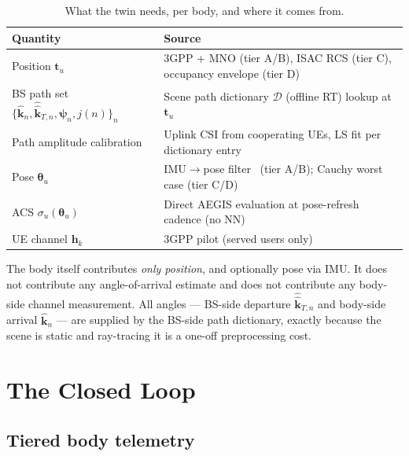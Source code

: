 \documentclass[journal,twocolumn,10pt]{IEEEtran}
\theoremstyle{definition}
\newcommand{\khat}{\hat{\bm{k}}}
\newcommand{\hh}{\mathbf{h}}
\newcommand{\Dict}{\mathcal{D}}
\begin{document}
\begin{table}[!t]
\centering
\caption{What the twin needs, per body, and where it comes from.}
\label{tab:what-twin-needs}
\begin{tabular}{@{}p{}p{}@{}}
\toprule
Quantity & Source \\
\midrule
Position $\mathbf{t}_u$       & 3GPP + MNO (tier A/B), ISAC RCS (tier C), occupancy envelope (tier D) \\
BS path set
$\{\khat_n,\hat{\khat}_{T,n},\bm\psi_n,j(n)\}_{n}$
                              & Scene path dictionary $\Dict$ (offline RT) lookup at $\mathbf{t}_u$ \\
Path amplitude calibration    & Uplink CSI from cooperating UEs, LS fit per dictionary entry \\
Pose $\bm\theta_u$            & IMU$\to$pose filter~\cite{Madgwick2011,VQF2022} (tier A/B); Cauchy worst case (tier C/D) \\
ACS $\sigma_u(\bm\theta_u)$   & Direct AEGIS evaluation at pose-refresh cadence (no NN) \\
UE channel $\hh_k$            & 3GPP pilot (served users only) \\
\bottomrule
\end{tabular}
\end{table}

The body itself contributes \emph{only position}, and optionally
pose via IMU. It does not contribute any angle-of-arrival
estimate and does not contribute any body-side channel
measurement. All angles --- BS-side departure $\hat{\khat}_{T,n}$
and body-side arrival $\khat_n$ --- are supplied by the BS-side
path dictionary, exactly because the scene is static and
ray-tracing it is a one-off preprocessing cost.

\section{The Closed Loop}\label{sec:loop}

\subsection{Tiered body telemetry}
\end{document}
